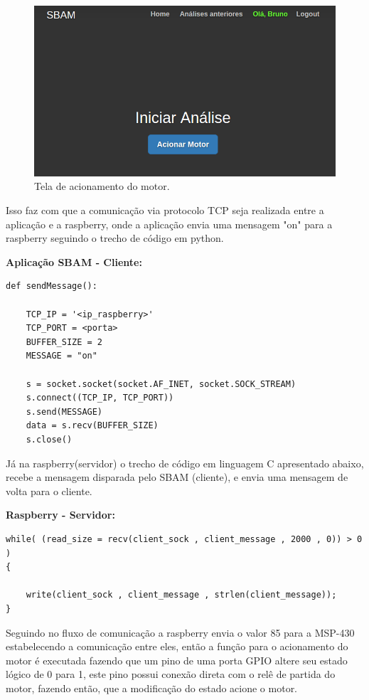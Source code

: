 \begin{figure}[h!]
	\centering
	\includegraphics[keepaspectratio=true,scale= 0.7]{figuras/acionarMotor.png}
	\caption{Tela de acionamento do motor.}
	\label{acionamentoDoMotor}
\end{figure}

Isso faz com que a comunicação via protocolo TCP seja realizada entre a aplicação e a raspberry, onde a aplicação envia uma mensagem "on" para a raspberry seguindo o trecho de código em python. 

\textbf{Aplicação SBAM - Cliente:}

\begin{lstlisting}
def sendMessage():

	TCP_IP = '<ip_raspberry>'
	TCP_PORT = <porta>
	BUFFER_SIZE = 2
	MESSAGE = "on"

	s = socket.socket(socket.AF_INET, socket.SOCK_STREAM)
	s.connect((TCP_IP, TCP_PORT))
	s.send(MESSAGE)
	data = s.recv(BUFFER_SIZE)
	s.close()
\end{lstlisting}

\pagebreak

Já na raspberry(servidor) o trecho de código em linguagem C apresentado abaixo, recebe a mensagem disparada pelo SBAM (cliente), e envia uma mensagem de volta para o cliente.

\textbf{Raspberry - Servidor:}

\begin{lstlisting}
while( (read_size = recv(client_sock , client_message , 2000 , 0)) > 0 )
{
	
	write(client_sock , client_message , strlen(client_message));
}
\end{lstlisting}
 
Seguindo no fluxo de comunicação a raspberry envia o valor 85 para a MSP-430 estabelecendo a comunicação entre eles, então a função para o acionamento do motor é executada fazendo que um pino de uma porta GPIO altere seu estado lógico de 0 para 1, este pino possui conexão direta com o relê de partida do motor, fazendo então, que a modificação do estado acione o motor.


